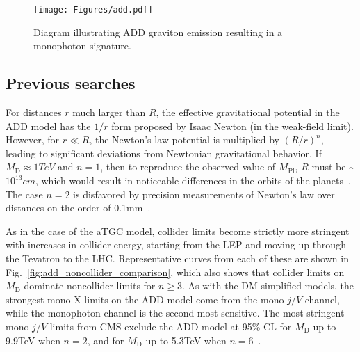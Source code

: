 \begin{figure}[hbtp]
  \begin{center}
    \texttt{[image: Figures/add.pdf]}
    \caption{
      Diagram illustrating ADD graviton emission resulting in a monophoton signature.
    }
    \label{fig:add_diagram}
  \end{center}
\end{figure}

\subsection{Previous searches} \label{sec:introduction_ADD_previous_searches}
For distances $r$ much larger than $R$, the effective gravitational potential in the ADD model has the $1/r$ form proposed by Isaac Newton (in the weak-field limit).
However, for $r \ll R$, the Newton's law potential is multiplied by $(R/r)^{n}$, leading to significant deviations from Newtonian gravitational behavior.
If $M_\mathrm{D} \approx 1\unit{TeV}$ and $n = 1$, then to reproduce the observed value of $M_\mathrm{Pl}$, $R$ must be \textasciitilde$10^{13}\unit{cm}$, which
would result in noticeable differences in the orbits of the planets~\cite{ref:S0370-2693(98)00466-3}. The case $n = 2$ is disfavored by precision
measurements of Newton's law over distances on the order of 0.1\unit{mm}~\cite{ref:0264-9381/32/3/033001}.

As in the case of the aTGC model, collider limits
become strictly more stringent with increases in collider energy, starting from the LEP and moving up through the Tevatron to the LHC.
Representative curves from each of these are shown in Fig.~\ref{fig:add_noncollider_comparison}, which also shows that collider limits
on $M_\mathrm{D}$ dominate noncollider limits for $n \geq 3$. As with the DM simplified models, the strongest mono-X limits on the ADD model come from
the mono-$j/V$ channel, while the monophoton channel is the second most sensitive. The most stringent mono-$j/V$ limits from CMS exclude the ADD model
at 95\% CL for $M_\mathrm{D}$ up to 9.9\unit{TeV} when $n = 2$, and for $M_\mathrm{D}$ up to 5.3\unit{TeV} when $n = 6$~\cite{ref:PhysRevD.97.092005}.

